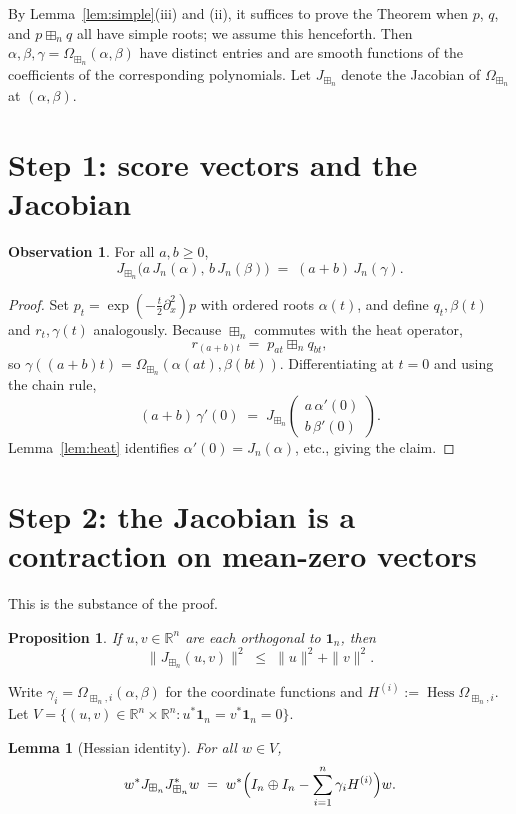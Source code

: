 \documentclass[11pt]{article}
\newcommand{\R}{\mathbb{R}}
\newcommand{\bn}{\boxplus_n}
\newcommand{\score}{J_n}
\newcommand{\Hess}{\operatorname{Hess}}
\newtheorem{lemma}{Lemma}
\newtheorem{proposition}{Proposition}
\theoremstyle{definition}
\newtheorem{observation}{Observation}
\begin{document}
By Lemma~\ref{lem:simple}(iii) and (ii), it suffices to prove the Theorem when
$p$, $q$, and $p\bn q$ all have simple roots; we assume this henceforth. Then
$\alpha,\beta,\gamma=\Omega_{\bn}(\alpha,\beta)$ have distinct entries and are
smooth functions of the coefficients of the corresponding polynomials. Let
$J_{\bn}$ denote the Jacobian of $\Omega_{\bn}$ at $(\alpha,\beta)$.

\section*{Step 1: score vectors and the Jacobian}

\begin{observation}\label{obs:scores}
For all $a,b\ge0$,
\[
J_{\bn}\bigl(a\,\score(\alpha),\,b\,\score(\beta)\bigr)\;=\;(a+b)\,\score(\gamma).
\]
\end{observation}

\begin{proof}
Set $p_t=\exp(-\tfrac t2\partial_x^2)p$ with ordered roots $\alpha(t)$, and
define $q_t,\beta(t)$ and $r_t,\gamma(t)$ analogously. Because $\bn$ commutes
with the heat operator,
\[
r_{(a+b)t}\;=\;p_{at}\bn q_{bt},
\]
so $\gamma((a+b)t)=\Omega_{\bn}(\alpha(at),\beta(bt))$. Differentiating at
$t=0$ and using the chain rule,
\[
(a+b)\,\gamma'(0)\;=\;J_{\bn}\!\begin{pmatrix} a\,\alpha'(0)\\ b\,\beta'(0)\end{pmatrix}.
\]
Lemma~\ref{lem:heat} identifies $\alpha'(0)=\score(\alpha)$, etc., giving the
claim.
\end{proof}

\section*{Step 2: the Jacobian is a contraction on mean-zero vectors}

This is the substance of the proof.

\begin{proposition}\label{prop:contraction}
If $u,v\in\R^n$ are each orthogonal to $\mathbf 1_n$, then
\[
\|J_{\bn}(u,v)\|^2\;\le\;\|u\|^2+\|v\|^2.
\]
\end{proposition}

Write $\gamma_i=\Omega_{\bn,i}(\alpha,\beta)$ for the coordinate functions and
$H^{(i)}:=\Hess\Omega_{\bn,i}$. Let
$V=\{(u,v)\in\R^n\times\R^n:u^\ast\mathbf 1_n=v^\ast\mathbf 1_n=0\}$.

\begin{lemma}[Hessian identity]\label{lem:hess}
For all $w\in V$,
\[
w^\ast J_{\bn}J_{\bn}^\ast w
\;=\;w^\ast\Bigl(I_n\oplus I_n-\sum_{i=1}^n\gamma_i H^{(i)}\Bigr)w.
\]
\end{lemma}
\end{document}
